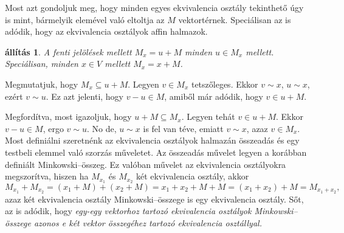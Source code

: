 \documentclass[9pt, a4paper, showtrims]{memoir}
\makeatletter
\renewenvironment{proof}[1][\proofname]
    {\par\pushQED{\qed}%
    \normalfont \topsep6\p@\@plus6\p@\relax
    \trivlist
    \item[\hskip\labelsep
        \itshape
    #1\@addpunct{:}]\ignorespaces}
    {\popQED\endtrivlist\@endpefalse}
\theoremstyle{plain}
\newtheorem{proposition}{állítás}[chapter]
\theoremstyle{remark}
\theoremstyle{definition}
\makeatother
\begin{document}
Most azt gondoljuk meg, hogy minden egyes ekvivalencia osztály tekinthető úgy is mint,
bármelyik elemével való eltoltja az $M$ vektortérnek.
Speciálisan az is adódik,
hogy az ekvivalencia osztályok affin halmazok.
\begin{proposition}
	A fenti jelölések mellett $M_x=u+M$ minden $u\in M_x$ mellett.
	Speciálisan, minden $x\in V$ mellett $M_x=x+M$.
\end{proposition}
\begin{proof}
	Megmutatjuk, hogy $M_x\subseteq u+M$.
	Legyen $v\in M_x$ tetszőleges.
	Ekkor $v\sim x$, $u\sim x$, ezért $v\sim u$.
	Ez azt jelenti, hogy $v-u\in M$, amiből már adódik,
	hogy $v\in u+M$.

	Megfordítva, most igazoljuk, hogy $u+M\subseteq M_x$.
	Legyen tehát $v\in u+M$.
	Ekkor $v-u\in M$, ergo $v\sim u$.
	No de, $u\sim x$ is fel van téve,
	emiatt $v\sim x$, azaz $v\in M_x$.
\end{proof}
Most definiálni szeretnénk az ekvivalencia osztályok halmazán összeadás és egy testbeli elemmel való
szorzás műveletet.
Az összeadás művelet legyen a korábban definiált Minkowski--összeg.
Ez valóban művelet az ekvivalencia osztályokra megszorítva,
hiszen ha $M_{x_1}$ és $M_{x_2}$ két ekvivalencia osztály,
akkor
\[
	M_{x_1}+M_{x_2}=\left( x_1+M \right)+\left( x_2+M \right)
	=
	x_1+x_2+M+M=
	\left( x_1+x_2 \right)+M
	=
	M_{x_1+x_2},\tag{\dag}
\]
azaz két ekvivalencia osztály Minkowski--összege is egy ekvivalencia osztály.
Sőt, az is adódik, hogy
\emph{
	egy-egy vektorhoz tartozó ekvivalencia osztályok Minkowski--összege
	azonos e két vektor összegéhez tartozó ekvivalencia osztállyal.}
\end{document}
